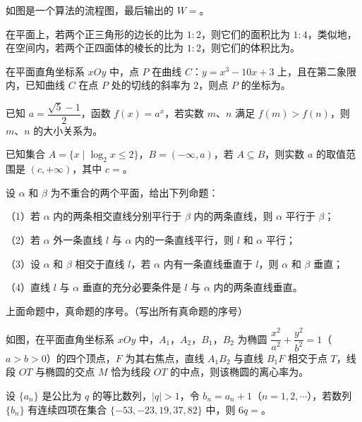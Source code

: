\begin{question}
如图是一个算法的流程图，最后输出的 $W=$\gkblank{}。
\nopagebreak[4]
\begin{center}\end{center}
\nopagebreak[4]
\end{question}
\begin{question}
在平面上，若两个正三角形的边长的比为 $1:2$，则它们的面积比为 $1:4$，类似地，在空间内，若两个正四面体的棱长的比为 $1:2$，则它们的体积比为\gkblank{}。

\end{question}
\begin{question}
在平面直角坐标系 $xOy$ 中，点 $P$ 在曲线 $C$：$y=x^3-10x+3$ 上，且在第二象限内，已知曲线 $C$ 在点 $P$ 处的切线的斜率为 $2$，则点 $P$ 的坐标为\gkblank{}。

\end{question}
\begin{question}
已知 $a=\dfrac{\sqrt5-1}{2}$，函数 $f(x)=a^x$，若实数 $m$、$n$ 满足 $f(m)>f(n)$，则 $m$、$n$ 的大小关系为\gkblank{}。

\end{question}
\begin{question}
已知集合 $A=\{x\mid \log_2x\leqslant2\}$，$B=(-\infty,a)$，若 $A\subseteq B$，则实数 $a$ 的取值范围是 $(c,+\infty)$，其中 $c=$\gkblank{}。

\end{question}
\begin{question}
设 $\alpha$ 和 $\beta$ 为不重合的两个平面，给出下列命题：

（1）若 $\alpha$ 内的两条相交直线分别平行于 $\beta$ 内的两条直线，则 $\alpha$ 平行于 $\beta$；

（2）若 $\alpha$ 外一条直线 $l$ 与 $\alpha$ 内的一条直线平行，则 $l$ 和 $\alpha$ 平行；

（3）设 $\alpha$ 和 $\beta$ 相交于直线 $l$，若 $\alpha$ 内有一条直线垂直于 $l$，则 $\alpha$ 和 $\beta$ 垂直；

（4）直线 $l$ 与 $\alpha$ 垂直的充分必要条件是 $l$ 与 $\alpha$ 内的两条直线垂直。

上面命题中，真命题的序号\gkblank{}。（写出所有真命题的序号）

\Needspace{0.4\textheight}
\end{question}
\begin{question}
如图，在平面直角坐标系 $xOy$ 中，$A_1$，$A_2$，$B_1$，$B_2$ 为椭圆 $\dfrac{x^2}{a^2}+\dfrac{y^2}{b^2}=1$（$a>b>0$）的四个顶点，$F$ 为其右焦点，直线 $A_1B_2$ 与直线 $B_1F$ 相交于点 $T$，线段 $OT$ 与椭圆的交点 $M$ 恰为线段 $OT$ 的中点，则该椭圆的离心率为\gkblank{}。
\nopagebreak[4]
\begin{center}\end{center}
\nopagebreak[4]
\end{question}
\begin{question}
设 $\{a_n\}$ 是公比为 $q$ 的等比数列，$|q|>1$，令 $b_n=a_n+1$（$n=1,2,\cdots$），若数列 $\{b_n\}$ 有连续四项在集合 $\{-53,-23,19,37,82\}$ 中，则 $6q=$\gkblank{}。

\end{question}

